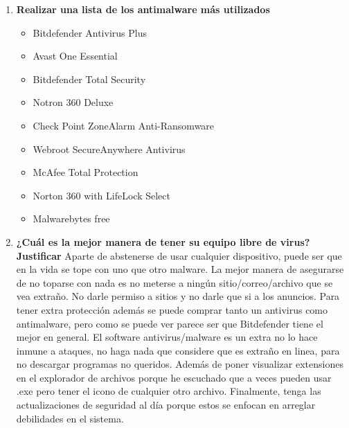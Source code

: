 \documentclass[stu, 12pt, letterpaper, donotrepeattitle, floatsintext, natbib, helv]{apa7}
\begin{document}
\begin{enumerate}
    \item \textbf{Realizar una lista de los antimalware más utilizados}
    \begin{itemize}
        \item Bitdefender Antivirus Plus
        \item Avast One Essential
        \item Bitdefender Total Security
        \item Notron 360 Deluxe
        \item Check Point ZoneAlarm Anti-Ransomware
        \item Webroot SecureAnywhere Antivirus
        \item McAfee Total Protection
        \item Norton 360 with LifeLock Select
        \item Malwarebytes free
    \end{itemize}
    
    \item \textbf{¿Cuál es la mejor manera de tener su equipo libre de virus? Justificar}
    Aparte de abstenerse de usar cualquier dispositivo, puede ser que en la vida se tope con uno que otro malware. La mejor manera de asegurarse de no toparse con nada es no meterse a ningún sitio/correo/archivo que se vea extraño. No darle permiso a sitios y no darle que si a los anuncios. Para tener extra protección además se puede comprar tanto un antivirus como antimalware, pero como se puede ver parece ser que Bitdefender tiene el mejor en general. El software antivirus/malware es un extra no lo hace inmune a ataques, no haga nada que considere que es extraño en linea, para no descargar programas no queridos. Además de poner visualizar extensiones en el explorador de archivos porque he escuchado que a veces pueden usar .exe pero tener el icono de cualquier otro archivo. Finalmente, tenga las actualizaciones de seguridad al día porque estos se enfocan en arreglar debilidades en el sistema.
\end{enumerate}

\end{document}

